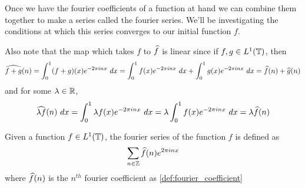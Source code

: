   Once we have the fourier coefficients of a function at hand we can combine them together to make a series called the fourier series. We'll be investigating the conditions at which this series converges to our initial function $f$.

  Also note that the map which takes $f$ to $\widehat{f}$ is linear since if $f, g \in L^1(\mathbb T)$, then $$\widehat{f+g}(n) = \int_0^1 (f+g)(x) e^{-2 \pi inx} \ dx = \int_0^1f(x)e^{-2\pi inx} \ dx + \int_0^1g(x)e^{-2\pi inx} \ dx = \hatf(n) + \hatg(n)$$ and for some $\lambda \in \mathbb R$, $$\widehat{\lambda f}(n) \ dx = \int_0^1 \lambda f(x) e^{-2\pi inx} \ dx = \lambda \int_0^1 f(x) e^{-2 \pi inx} \ dx = \lambda\widehat{f}(n)$$

  \begin{definition}
    \label{def:fourier_series}
    Given a function $f \in L^1(\mathbb T)$, the fourier series of the function $f$ is defined as 
    \begin{displaymath}
      \sum_{n\in \mathbb Z} \widehat{f}(n)e^{2\pi inx}
    \end{displaymath}
    where $\widehat{f}(n)$ is the $n^{th}$ fourier coefficient as \autoref{def:fourier_coefficient} 
  \end{definition}

